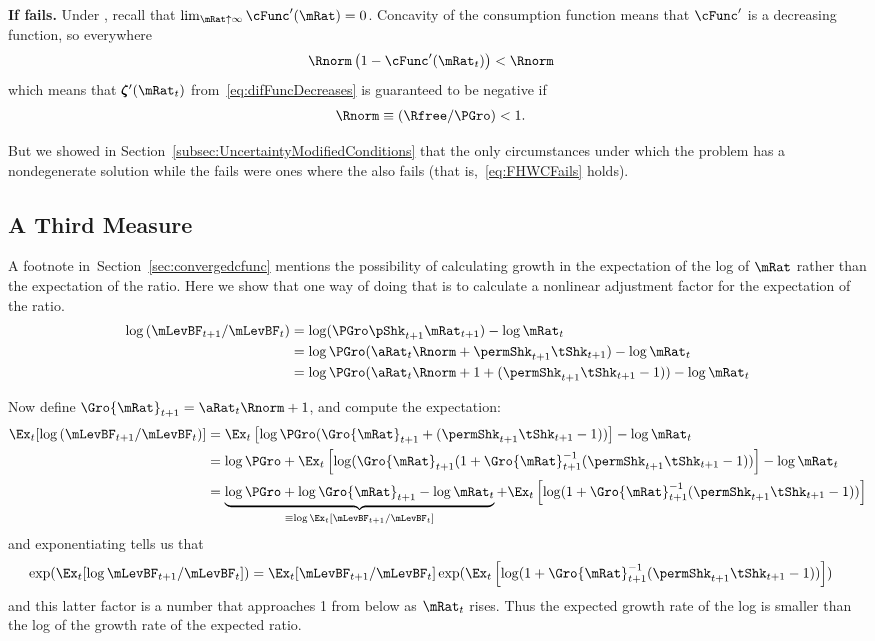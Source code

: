 \documentclass[\econtexRoot/BufferStockTheory]{subfiles}
\begin{document}
\textbf{If {\RIC} fails.}
Under \cncl{\RIC}, recall that $\lim_{\mRat \uparrow \infty} \cFunc^{\prime}(\mRat) = 0$.  Concavity of the consumption function means that $\cFunc^{\prime}$ is a decreasing function, so everywhere 
\begin{align*}
  \Rnorm\left(1-\cFunc^{\prime}({\mRat}_t)\right) & < \Rnorm
\end{align*}
which means that $\difFunc^{\prime}(\mRat_{t})$ from~\eqref{eq:difFuncDecreases} is guaranteed to be negative if
\begin{align}
  \Rnorm \equiv (\Rfree/\PGro) & < 1  \label{eq:FHWCFails}.
\end{align}

But we showed in Section~\ref{subsec:UncertaintyModifiedConditions} that the only circumstances under which the problem has a nondegenerate solution while the {\RIC} fails were ones where the {\FHWC} also fails (that is,~\eqref{eq:FHWCFails} holds).

\subsection{A Third Measure}

A footnote in~Section~\ref{sec:convergedcfunc} mentions the possibility of calculating growth in the expectation of the log of $\mRat$ rather than the expectation of the ratio.  Here we show that one way of doing that is to calculate a nonlinear adjustment factor for the expectation of the ratio.
\begin{align*}
\log \left(\mLevBF_{t+1}/\mLevBF_{t}\right) & = \log (\PGro \pShk_{t+1} \mRat_{t+1})- \log \mRat_{t} 
\\ & = \log \PGro (\aRat_{t}\Rnorm+\permShk_{t+1}\tShk_{t+1})- \log \mRat_{t} 
\\ & = \log \PGro (\aRat_{t}\Rnorm+1+(\permShk_{t+1}\tShk_{t+1}-1))- \log \mRat_{t}
\end{align*}

Now define $\Gro{\mRat}_{t+1}=\aRat_{t}\Rnorm+1$, and compute the expectation:
\begin{align*}
  \Ex_{t}[\log \left(\mLevBF_{t+1}/\mLevBF_{t}\right)]
   & = \Ex_{t}\left[\log \PGro (\Gro{\mRat}_{t+1}+(\permShk_{t+1}\tShk_{t+1}-1))\right]- \log \mRat_{t} 
\\ & = \log \PGro + \Ex_{t}\left[\log (\Gro{\mRat}_{t+1}(1+\Gro{\mRat}_{t+1}^{-1}(\permShk_{t+1}\tShk_{t+1}-1))\right]- \log \mRat_{t} 
\\ & = \underbrace{\log \PGro + \log \Gro{\mRat}_{t+1} - \log \mRat_{t}}_{\equiv \log \Ex_{t}[\mLevBF_{t+1}/\mLevBF_{t}]} + \Ex_{t}\left[ \log (1+\Gro{\mRat}_{t+1}^{-1}(\permShk_{t+1}\tShk_{t+1}-1))\right]
\end{align*}
and exponentiating tells us that
\begin{align}
  \exp(\Ex_{t}[\log \mLevBF_{t+1}/\mLevBF_{t}]) & = \Ex_{t}[\mLevBF_{t+1}/\mLevBF_{t}]\exp( \Ex_{t}\left[ \log (1+\Gro{\mRat}_{t+1}^{-1}(\permShk_{t+1}\tShk_{t+1}-1))\right])
\end{align}
and this latter factor is a number that approaches 1 from below as $\mRat_{t}$ rises.  Thus the expected growth rate of the log is smaller than the log of the growth rate of the expected ratio.
\end{document}
